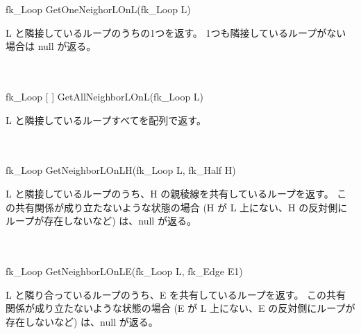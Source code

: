 \begin{tabbing}
 \> fk\_Loop GetOneNeighorLOnL(fk\_Loop L) \\
	\> \> \begin{minipage}[]{15cm}
		L と隣接しているループのうちの1つを返す。
		1つも隣接しているループがない場合は null が返る。
	\end{minipage} \\ \\

 \> fk\_Loop [ ] GetAllNeighborLOnL(fk\_Loop L) \\
	\> \> \begin{minipage}[]{15cm}
		L と隣接しているループすべてを配列で返す。
	\end{minipage} \\ \\

 \> fk\_Loop GetNeighborLOnLH(fk\_Loop L, fk\_Half H) \\
	\> \> \begin{minipage}[]{15cm}
		L と隣接しているループのうち、H の親稜線を共有しているループを返す。
		この共有関係が成り立たないような状態の場合
		(H が L 上にない、H の反対側にループが存在しないなど) は、null が返る。
	\end{minipage} \\ \\

 \> fk\_Loop GetNeighborLOnLE(fk\_Loop L, fk\_Edge E1) \\
	\> \> \begin{minipage}[]{15cm}
		L と隣り合っているループのうち、E を共有しているループを返す。
		この共有関係が成り立たないような状態の場合
		(E が L 上にない、E の反対側にループが存在しないなど) は、null が返る。
	\end{minipage}
\end{tabbing}

